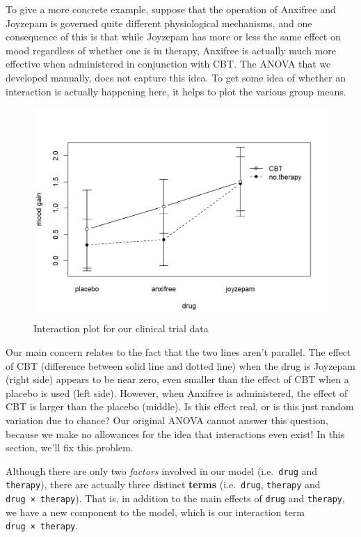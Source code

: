 \documentclass[
  11pt,
  a4paper,
  twoside,symmetric,openright]{book}
\theoremstyle{break}
\theoremstyle{break}
\begin{document}
To give a more concrete example, suppose that the operation of Anxifree and Joyzepam is governed quite different physiological mechanisms, and one consequence of this is that while Joyzepam has more or less the same effect on mood regardless of whether one is in therapy, Anxifree is actually much more effective when administered in conjunction with CBT. The ANOVA that we developed manually, does not capture this idea. To get some idea of whether an interaction is actually happening here, it helps to plot the various group means.

\begin{figure}

{\centering \includegraphics[width=0.6\linewidth]{resources/image/interactionplot} 

}

\caption{Interaction plot for our clinical trial data}\label{fig:interactionplot}
\end{figure}

Our main concern relates to the fact that the two lines aren't parallel. The effect of CBT (difference between solid line and dotted line) when the drug is Joyzepam (right side) appears to be near zero, even smaller than the effect of CBT when a placebo is used (left side). However, when Anxifree is administered, the effect of CBT is larger than the placebo (middle). Is this effect real, or is this just random variation due to chance? Our original ANOVA cannot answer this question, because we make no allowances for the idea that interactions even exist! In this section, we'll fix this problem.

Although there are only two \emph{factors} involved in our model (i.e.~\texttt{drug} and \texttt{therapy}), there are actually three distinct \textbf{terms} (i.e.~\texttt{drug}, \texttt{therapy} and \texttt{drug\ ×\ therapy}). That is, in addition to the main effects of \texttt{drug} and \texttt{therapy}, we have a new component to the model, which is our interaction term \texttt{drug\ ×\ therapy}.
\end{document}

